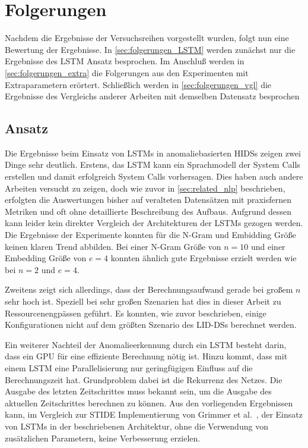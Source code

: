 \chapter{Folgerungen}\label{ch:folgerungen}
Nachdem die Ergebnisse der Versuchsreihen vorgestellt wurden, folgt nun eine Bewertung der Ergebnisse.
In \autoref{sec:folgerungen_LSTM} werden zunächst nur die Ergebnisse des \ac{LSTM} Ansatz besprochen.
Im Anschluß werden in \autoref{sec:folgerungen_extra} die Folgerungen aus den Experimenten mit Extraparametern erörtert. 
Schließlich werden in \autoref{sec:folgerungen_vgl} die Ergebnisse des Vergleichs anderer Arbeiten mit demselben Datensatz besprochen

\section{ Ansatz}\label{sec:folgerungen_LSTM}

Die Ergebnisse beim Einsatz von \acp{LSTM} in anomaliebasierten \acp{HIDS} zeigen zwei Dinge sehr deutlich.
Erstens, das \ac{LSTM} kann ein Sprachmodell der System Calls erstellen und damit erfolgreich System Calls vorhersagen.
Dies haben auch andere Arbeiten versucht zu zeigen, doch wie zuvor in \autoref{sec:related_nlp} beschrieben, erfolgten die Auswertungen bisher auf veralteten Datensätzen mit praxisfernen Metriken und oft ohne detaillierte Beschreibung des Aufbaus.
Aufgrund dessen kann leider kein direkter Vergleich der Architekturen der \acp{LSTM} gezogen werden.
Die Ergebnisse der Experimente konnten für die N-Gram und Embidding Größe keinen klaren Trend abbilden.
Bei einer N-Gram Größe von $n=10$ und einer Embedding Größe von $e=4$ konnten ähnlich gute Ergebnisse erzielt werden wie bei $n=2$ und $e=4$.\par\medskip

Zweitens zeigt sich allerdings, dass der Berechnungsaufwand gerade bei großem $n$ sehr hoch ist.
Speziell bei sehr großen Szenarien hat dies in dieser Arbeit zu Ressourcenengpässen geführt.
Es konnten, wie zuvor beschrieben, einige Konfigurationen nicht auf dem größten Szenario des \acp{LID-DS} berechnet werden.\par\medskip
Ein weiterer Nachteil der Anomalieerkennung durch ein \ac{LSTM} besteht darin, dass ein GPU für eine effiziente Berechnung nötig ist.
Hinzu kommt, dass mit einem \ac{LSTM} eine Parallelisierung nur geringfügigen Einfluss auf die Berechnungszeit hat.
Grundproblem dabei ist die Rekurrenz des Netzes. 
Die Ausgabe des letzten Zeitschrittes muss bekannt sein, um die Ausgabe des aktuellen Zeitschrittes berechnen zu können.
Aus den vorliegenden Ergebnissen kann, im Vergleich zur \ac{STIDE} Implementierung von Grimmer et al.~\cite{IDSTHREADGRIMMER2021}, der Einsatz von \acp{LSTM} in der beschriebenen Architektur, ohne die Verwendung von zusätzlichen Parametern, keine Verbesserung erzielen.\par\medskip

